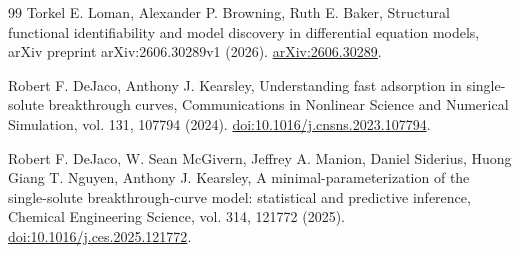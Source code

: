 \begin{thebibliography}{99}
 Torkel E. Loman, Alexander P. Browning, Ruth E. Baker, Structural functional identifiability and model discovery in differential equation models, arXiv preprint arXiv:2606.30289v1 (2026). \href{https://arxiv.org/abs/2606.30289}{arXiv:2606.30289}.

 Robert F. DeJaco, Anthony J. Kearsley, Understanding fast adsorption in single-solute breakthrough curves, Communications in Nonlinear Science and Numerical Simulation, vol. 131, 107794 (2024). \href{https://doi.org/10.1016/j.cnsns.2023.107794}{doi:10.1016/j.cnsns.2023.107794}.

 Robert F. DeJaco, W. Sean McGivern, Jeffrey A. Manion, Daniel Siderius, Huong Giang T. Nguyen, Anthony J. Kearsley, A minimal-parameterization of the single-solute breakthrough-curve model: statistical and predictive inference, Chemical Engineering Science, vol. 314, 121772 (2025). \href{https://doi.org/10.1016/j.ces.2025.121772}{doi:10.1016/j.ces.2025.121772}.
\end{thebibliography}
